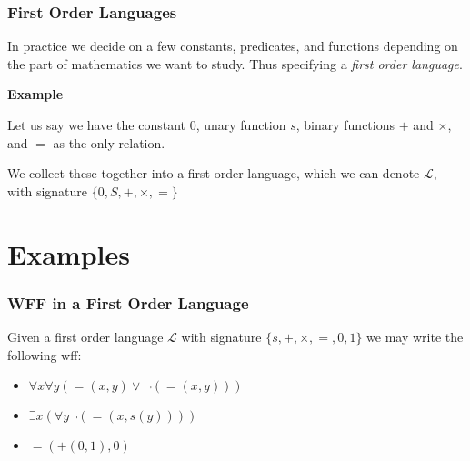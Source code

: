 \documentclass{beamer}
\theoremstyle{indentDefn} \newtheorem{defn}[]{Definition}
\begin{document}
\begin{frame}
	\frametitle{First Order Languages}
	
	In practice we decide on a few constants, predicates, and functions depending on the part of mathematics we want to study. Thus specifying a \emph{first order language}.
	
	\vspace{0.5cm}
	
	{\bf Example} 
	
	Let us say we have the constant $0$, unary function $s$, binary functions $+$ and $\times$, and $=$ as the only relation.
	\vspace{0.5cm}	
	
	We collect these together into a first order language, which we can denote $\mathcal{L}$, with signature $\{0,S,+,\times,=\}$

	
	\vspace{1cm}
	
	
\end{frame}

\section{Examples}

\begin{frame}
	\frametitle{WFF in a First Order Language}
	
	Given a first order language $\mathcal{L}$ with signature $\{s,+,\times,=,0,1\}$ we may write the following wff:
	
	\begin{itemize}
		\item  $\forall x \forall y (=(x,y) \lor \lnot(=(x,y)))$
		\item  $\exists x (\forall y \lnot(=(x,s(y))))$
		\item $=(+(0,1),0)$
	\end{itemize}
	
	\vspace{5cm}
	
\end{frame}
\end{document}
